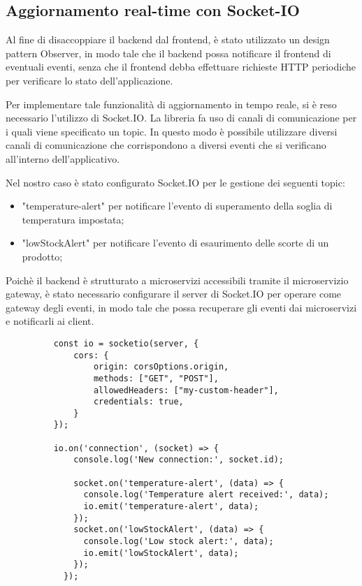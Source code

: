 \subsection{Aggiornamento real-time con Socket-IO}
Al fine di disaccoppiare il backend dal frontend, è stato utilizzato un design pattern Observer, in modo tale che il backend possa notificare il frontend di eventuali eventi, senza che il frontend debba effettuare richieste HTTP periodiche per verificare lo stato dell'applicazione.

Per implementare tale funzionalità di aggiornamento in tempo reale, si è reso necessario l'utilizzo di Socket.IO. 
La libreria fa uso di canali di comunicazione per i quali viene specificato un topic. 
In questo modo è possibile utilizzare diversi canali di comunicazione che corrispondono a diversi eventi che si verificano all'interno dell'applicativo. 

Nel nostro caso è stato configurato Socket.IO per le gestione dei seguenti topic:
\begin{itemize}
  \item "temperature-alert" per notificare l'evento di superamento della soglia di temperatura impostata;
  \item "lowStockAlert" per notificare l'evento di esaurimento delle scorte di un prodotto;
\end{itemize}

Poichè il backend è strutturato a microservizi accessibili tramite il microservizio gateway, è stato necessario configurare il server di Socket.IO per operare come gateway degli eventi, in modo tale che possa recuperare gli eventi dai microservizi e notificarli ai client.

\begin{figure}[H]
\centering
\begin{verbatim}
    const io = socketio(server, {
        cors: {
            origin: corsOptions.origin,
            methods: ["GET", "POST"],
            allowedHeaders: ["my-custom-header"],
            credentials: true,
        }
    });

    io.on('connection', (socket) => {
        console.log('New connection:', socket.id);
      
        socket.on('temperature-alert', (data) => {
          console.log('Temperature alert received:', data);
          io.emit('temperature-alert', data);
        });
        socket.on('lowStockAlert', (data) => {
          console.log('Low stock alert:', data);
          io.emit('lowStockAlert', data);
        });
      });
\end{verbatim}
\end{figure}

